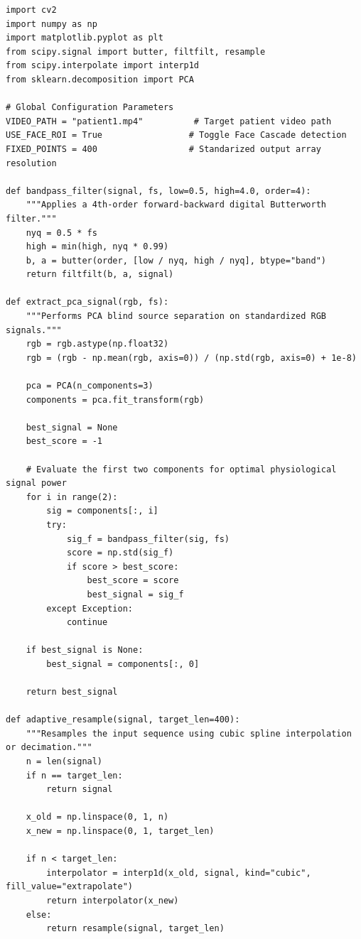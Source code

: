 \begin{verbatim}
import cv2
import numpy as np
import matplotlib.pyplot as plt
from scipy.signal import butter, filtfilt, resample
from scipy.interpolate import interp1d
from sklearn.decomposition import PCA

# Global Configuration Parameters
VIDEO_PATH = "patient1.mp4"          # Target patient video path
USE_FACE_ROI = True                 # Toggle Face Cascade detection
FIXED_POINTS = 400                  # Standarized output array resolution

def bandpass_filter(signal, fs, low=0.5, high=4.0, order=4):
    """Applies a 4th-order forward-backward digital Butterworth filter."""
    nyq = 0.5 * fs
    high = min(high, nyq * 0.99)
    b, a = butter(order, [low / nyq, high / nyq], btype="band")
    return filtfilt(b, a, signal)

def extract_pca_signal(rgb, fs):
    """Performs PCA blind source separation on standardized RGB signals."""
    rgb = rgb.astype(np.float32)
    rgb = (rgb - np.mean(rgb, axis=0)) / (np.std(rgb, axis=0) + 1e-8)

    pca = PCA(n_components=3)
    components = pca.fit_transform(rgb)

    best_signal = None
    best_score = -1

    # Evaluate the first two components for optimal physiological signal power
    for i in range(2):
        sig = components[:, i]
        try:
            sig_f = bandpass_filter(sig, fs)
            score = np.std(sig_f)
            if score > best_score:
                best_score = score
                best_signal = sig_f
        except Exception:
            continue

    if best_signal is None:
        best_signal = components[:, 0]

    return best_signal

def adaptive_resample(signal, target_len=400):
    """Resamples the input sequence using cubic spline interpolation or decimation."""
    n = len(signal)
    if n == target_len:
        return signal

    x_old = np.linspace(0, 1, n)
    x_new = np.linspace(0, 1, target_len)

    if n < target_len:
        interpolator = interp1d(x_old, signal, kind="cubic", fill_value="extrapolate")
        return interpolator(x_new)
    else:
        return resample(signal, target_len)


\end{verbatim}
